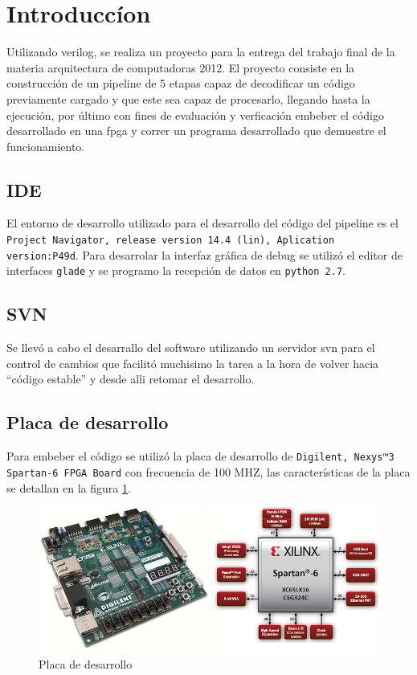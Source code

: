 \newpage
\section{Introducc\'ion}

Utilizando verilog, se realiza un proyecto para la entrega del trabajo final de la materia arquitectura de computadoras 2012. El proyecto consiste en la construcción de un pipeline de 5 etapas capaz de decodificar un código previamente cargado y que este sea capaz de procesarlo, llegando hasta la ejecución, por último con fines de evaluación y verficaci\'on embeber el c\'odigo desarrollado en una fpga y correr un programa desarrollado que demuestre el funcionamiento.

\subsection{IDE}
El entorno de desarrollo utilizado para el desarrollo del c\'odigo del pipeline es el \texttt{Project Navigator, release version 14.4 (lin), Aplication version:P49d}.
Para desarrolar la interfaz gr\'afica de debug se utiliz\'o el editor de interfaces \texttt{glade} y se programo la recepci\'on de datos en \texttt{python 2.7}. 

\subsection{SVN}
Se llev\'o a cabo el desarrallo del software utilizando un servidor svn para el control de cambios que facilit\'o muchisimo la tarea a la hora de volver hacia ``c\'odigo estable'' y desde alli retomar el desarrollo.

\subsection{Placa de desarrollo}
Para embeber el c\'odigo se utiliz\'o la placa de desarrollo de \texttt{Digilent, Nexys™3 Spartan-6 FPGA Board} con frecuencia de 100 MHZ, las caracter\'isticas de la placa se detallan en la figura \ref{fig:digilent}.
\begin{figure}[H]
\centering
\includegraphics[scale=0.35]{img/digilent}
\caption{Placa de desarrollo}
\label{fig:digilent}
\end{figure} 		 
\newpage		